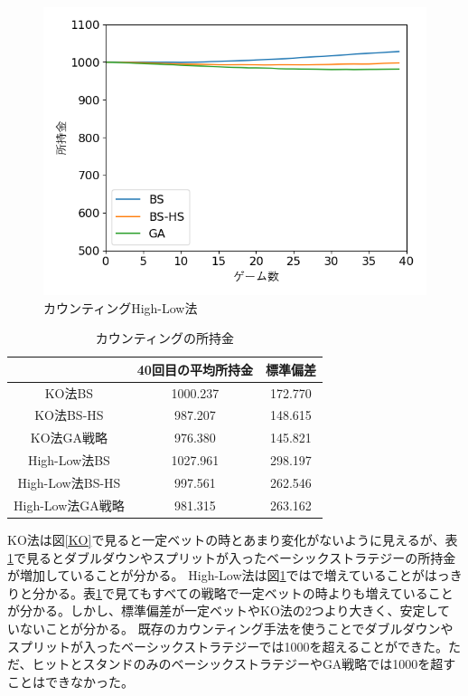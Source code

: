 \begin{figure}[H]
 \begin{center} 
  \includegraphics[width=0.7\linewidth]{./figure/betsimulation-Hi-Lo}
  \caption{カウンティングHigh-Low法\label{Hi-Lo}}
 \end{center}
\end{figure}

\begin{table}[H]
 \caption{カウンティングの所持金\label{countting}}
 \begin{center}
  \begin{tabular}{|c|c|c|}
  \hline  & 40回目の平均所持金 & 標準偏差 \\
  \hline KO法BS & 1000.237 & 172.770\\
  \hline KO法BS-HS & 987.207 & 148.615 \\
  \hline KO法GA戦略 & 976.380 & 145.821\\
  \hline High-Low法BS & 1027.961 & 298.197\\
  \hline High-Low法BS-HS  & 997.561 & 262.546\\
  \hline High-Low法GA戦略 & 981.315 & 263.162\\
  \hline
  \end{tabular}
 \end{center}
\end{table}

KO法は図\ref{KO}で見ると一定ベットの時とあまり変化がないように見えるが、表\ref{countting}で見るとダブルダウンやスプリットが入ったベーシックストラテジーの所持金が増加していることが分かる。
 High-Low法は図\ref{Hi-Lo}ではで増えていることがはっきりと分かる。表\ref{countting}で見てもすべての戦略で一定ベットの時よりも増えていることが分かる。しかし、標準偏差が一定ベットやKO法の2つより大きく、安定していないことが分かる。
 既存のカウンティング手法を使うことでダブルダウンやスプリットが入ったベーシックストラテジーでは1000を超えることができた。ただ、ヒットとスタンドのみのベーシックストラテジーやGA戦略では1000を超すことはできなかった。

